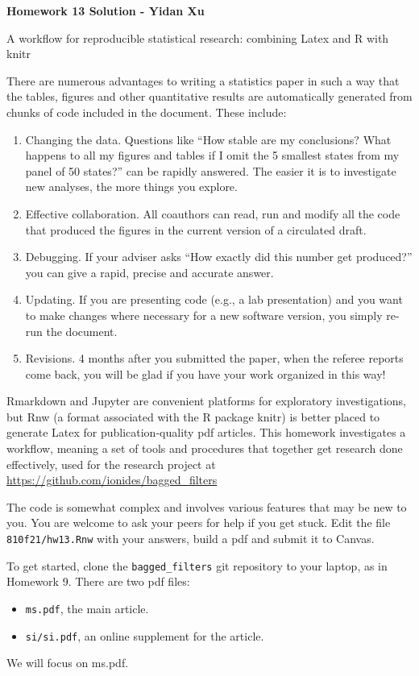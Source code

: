 \documentclass[12pt]{article}\usepackage[]{graphicx}\usepackage[]{color}
\begin{document}

\begin{center}\bf
Homework 13 Solution - Yidan Xu

A workflow for reproducible statistical research: combining Latex and R with knitr

\end{center}

There are numerous advantages to writing a statistics paper in such a way that the tables, figures and other quantitative results are automatically generated from chunks of code included in the document. These include:
\begin{enumerate}
\item Changing the data. Questions like ``How stable are my conclusions? What happens to all my figures and tables if I omit the 5 smallest states from my panel of 50 states?'' can be rapidly answered. The easier it is to investigate new analyses, the more things you explore. 
\item Effective collaboration. All coauthors can read, run and modify all the code that produced the figures in the current version of a circulated draft.
\item Debugging. If your adviser asks ``How exactly did this number get produced?'' you can give a rapid, precise and accurate answer.
\item Updating. If you are presenting code (e.g., a lab presentation) and you want to make changes where necessary for a new software version, you simply re-run the document.
\item Revisions. 4 months after you submitted the paper, when the referee reports come back, you will be glad if you have your work organized in this way!
\end{enumerate}
Rmarkdown and Jupyter are convenient platforms for exploratory investigations, but Rnw (a format associated with the R package knitr) is better placed to generate Latex for publication-quality pdf articles. This homework investigates a workflow, meaning a set of tools and procedures that together get research done effectively, used for the research project at \url{https://github.com/ionides/bagged_filters}

The code is somewhat complex and involves various features that may be new to you. You are welcome to ask your peers for help if you get stuck. Edit the file \texttt{810f21/hw13.Rnw} with your answers, build a pdf and submit it to Canvas.

To get started, clone the \texttt{bagged\_filters} git repository to your laptop, as in Homework 9. There are two pdf files:
  \begin{itemize}
  \item \texttt{ms.pdf}, the main article.
  \item \texttt{si/si.pdf}, an online supplement for the article.
  \end{itemize}
  We will focus on ms.pdf.
\end{document}
